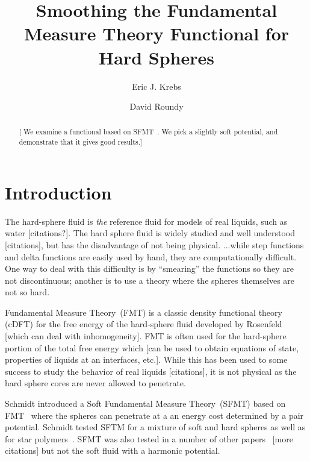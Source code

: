 \documentclass[letterpaper,twocolumn,amsmath,amssymb,prb]{revtex4-1}
\newcommand{\red}[1]{{\color{red} #1}}
\newcommand{\fixme}[1]{\red{[#1]}}
\begin{document}
\title{Smoothing the Fundamental Measure Theory Functional for Hard Spheres}

\author{Eric J. Krebs}

\author{David Roundy}

\begin{abstract}
\fixme{ We examine a functional based on SFMT~\cite{schmidt2000fluid}.
  We pick a slightly soft potential, and demonstrate that it gives
  good results.}
\end{abstract}

\maketitle

\section{Introduction}

The hard-sphere fluid is \emph{the} reference fluid for models of real
liquids, such as water \fixme{citations?}. The hard sphere fluid is
widely studied and well understood \fixme{citations}, but has the
disadvantage of not being physical. ...while step functions and delta
functions are easily used by hand, they are computationally
difficult. One way to deal with this difficulty is by ``smearing'' the
functions so they are not discontinuous; another is to use a theory
where the spheres themselves are not so hard.

Fundamental Measure Theory~(FMT) is a classic density functional
theory (cDFT) for the free energy of the hard-sphere fluid developed
by Rosenfeld~\cite{rosenfeld1989} \fixme{which can deal with
  inhomogeneity}.  FMT is often used for the hard-sphere portion of
the total free energy which \fixme{can be used to obtain equations of
  state, properties of liquids at an interfaces, etc.}.  While this
has been used to some success to study the behavior of real
liquids\fixme{citations}, it is not physical as the hard sphere cores
are never allowed to penetrate.

Schmidt introduced a Soft Fundamental Measure Theory~(SFMT) based on
FMT~\cite{schmidt1999density} where the spheres can penetrate at a an
energy cost determined by a pair potential. Schmidt tested SFTM for a
mixture of soft and hard spheres as well as for star
polymers~\cite{schmidt2000density, groh2001density}. SFMT was also
tested in a number of other papers~\cite{rosenfeld2000fluid}
\fixme{more citations} but not the soft fluid with a harmonic
potential.
\end{document}
